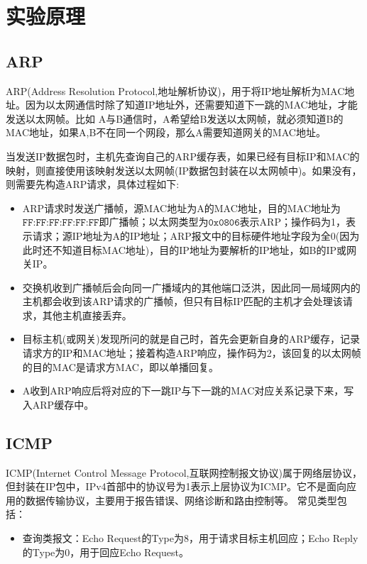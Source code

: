 \section{实验原理}
\subsection{ARP}
ARP(Address Resolution Protocol,地址解析协议)，用于将IP地址解析为MAC地址。因为以太网通信时除了知道IP地址外，还需要知道下一跳的MAC地址，才能发送以太网帧。比如
A与B通信时，A希望给B发送以太网帧，就必须知道B的MAC地址，如果A,B不在同一个网段，那么A需要知道网关的MAC地址。

当发送IP数据包时，主机先查询自己的ARP缓存表，如果已经有目标IP和MAC的映射，则直接使用该映射发送以太网帧(IP数据包封装在以太网帧中)。如果没有，则需要先构造ARP请求，具体过程如下:
\begin{itemize}
    \item ARP请求时发送广播帧，源MAC地址为A的MAC地址，目的MAC地址为$\texttt{FF:FF:FF:FF:FF:FF}$即广播帧；以太网类型为$\texttt{0x0806}$表示ARP；操作码为1，表示请求；源IP地址为A的IP地址；ARP报文中的目标硬件地址字段为全0(因为此时还不知道目标MAC地址)，目的IP地址为要解析的IP地址，如B的IP或网关IP。
    \item 交换机收到广播帧后会向同一广播域内的其他端口泛洪，因此同一局域网内的主机都会收到该ARP请求的广播帧，但只有目标IP匹配的主机才会处理该请求，其他主机直接丢弃。
    \item 目标主机(或网关)发现所问的就是自己时，首先会更新自身的ARP缓存，记录请求方的IP和MAC地址；接着构造ARP响应，操作码为2，该回复的以太网帧的目的MAC是请求方MAC，即以单播回复。
    \item A收到ARP响应后将对应的下一跳IP与下一跳的MAC对应关系记录下来，写入ARP缓存中。
\end{itemize}

\subsection{ICMP}
ICMP(Internet Control Message Protocol,互联网控制报文协议)属于网络层协议，但封装在IP包中，IPv4首部中的协议号为1表示上层协议为ICMP。它不是面向应用的数据传输协议，主要用于报告错误、网络诊断和路由控制等。
常见类型包括：
\begin{itemize}
    \item 查询类报文：Echo Request的Type为8，用于请求目标主机回应；Echo Reply的Type为0，用于回应Echo Request。
\end{itemize}

